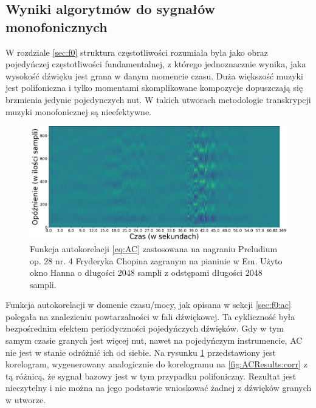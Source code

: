 \documentclass[12pt,a4paper,twoside]{mwart}
\begin{document}
\subsection{Wyniki algorytmów do sygnałów monofonicznych}\label{sec:MultiPitch:monofon}
W rozdziale \ref{sec:f0} struktura częstotliwości rozumiała była jako obraz pojedyńczej częstotliwości fundamentalnej, z którego jednoznacznie wynika, jaka wysokość dźwięku jest grana w danym momencie czasu. Duża większość muzyki jest polifoniczna i tylko momentami skomplikowane kompozycje dopuszczają się brzmienia jedynie pojedynczych nut. W takich utworach metodologie transkrypcji muzyki monofonicznej są nieefektywne.

\begin{figure}[ht]
  \begin{center}
    \includegraphics[scale=0.38]{images/AC/korelogram_multif0_cropped.png}
    \caption{Funkcja autokorelacji \ref{eq:AC} zastosowana na nagraniu Preludium op. 28 nr. 4 Fryderyka Chopina zagranym na pianinie w Em. Użyto okno Hanna o długości 2048 sampli z odstępami długości 2048 sampli.}
    \label{fig:multi:ac}
  \end{center}
\end{figure}

Funkcja autokorelacji w domenie czasu/mocy, jak opisana w sekcji \ref{sec:f0:ac} polegała na znalezieniu powtarzalności w fali dźwiękowej. Ta cykliczność była bezpośrednim efektem periodyczności pojedyńczych dźwięków. Gdy w tym samym czasie granych jest więcej nut, nawet na pojedyńczym instrumencie, AC nie jest w stanie odróżnić ich od siebie. Na rysunku \ref{fig:multi:ac} przedstawiony jest korelogram, wygenerowany analogicznie do korelogramu na \ref{fig:ACResults:corr} z tą różnicą, że sygnał bazowy jest w tym przypadku polifoniczny. Rezultat jest nieczytelny i nie można na jego podstawie wnioskować żadnej z dźwięków granych w utworze.
\end{document}
